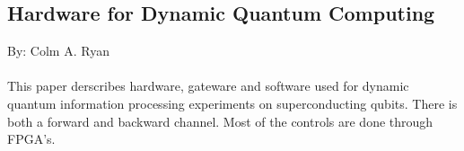 \subsection*{Hardware for Dynamic Quantum Computing}
By: Colm A. Ryan\\
\\
This paper derscribes hardware, gateware and software used for dynamic quantum information processing experiments on superconducting qubits. There is both a forward and backward channel. Most of the controls are done through FPGA's. 